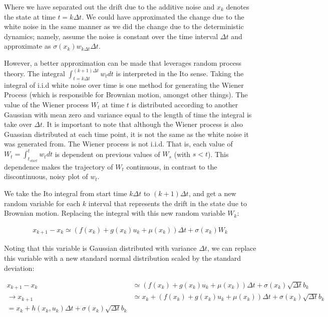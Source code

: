 \documentclass[a4paper]{article}
\begin{document}
Where we have separated out the drift due to the additive noise and $x_k$ denotes the state at time $t = k \Delta t$.
We could have approximated the change due to the white noise in the same manner as we did the change due to the deterministic dynamics;
namely, assume the noise is constant over the time interval $\Delta t$ and approximate as $\sigma(x_k) w_{k \Delta t} \Delta t$.

However, a better approximation can be made that leverages random process theory.
The integral $\int_{t = k \Delta t}^{(k+1) \Delta t} w_t dt$ is interpreted in the Ito sense.
Taking the integral of i.i.d white noise over time is one method for generating the Wiener Process (which is responsible for Brownian motion, amongst other things).
The value of the Wiener process $W_t$ at time $t$ is distributed according to another Gaussian with mean zero and variance equal to the length of time the integral is take over $\Delta t$.
It is important to note that although the Wiener process is also Guassian distributed at each time point, it is not the same as the white noise it was generated from.
The Wiener process is not i.i.d.
That is, each value of $W_t = \int_{t_{start}}^{t} w_t dt$ is dependent on previous values of $W_s$ (with $s<t$).
This dependence makes the trajectory of $W_t$ continuous, in contrast to the discontinuous, noisy plot of $w_t$.

We take the Ito integral from start time $k \Delta t$ to $(k+1) \Delta t$, and get a new random variable for each $k$ interval that represents the drift in the state due to Brownian motion.
Replacing the integral with this new random variable $W_k$:

\begin{align}
x_{k+1} - x_k \simeq (f(x_k) + g(x_k) u_k + \mu(x_k)) \Delta t + \sigma(x_k) W_k
\end{align}

Noting that this variable is Gaussian distributed with variance $\Delta t$, we can replace this variable with a new standard normal distribution scaled by the standard deviation:

\begin{align}
x_{k+1} - x_k &\simeq (f(x_k) + g(x_k) u_k + \mu(x_k)) \Delta t + \sigma(x_k) \sqrt{\Delta t} b_k
\\ \rightarrow x_{k+1} &\simeq x_k + (f(x_k) + g(x_k) u_k + \mu(x_k)) \Delta t + \sigma(x_k) \sqrt{\Delta t} b_k
\label{eq:DistochDyn}
\\= x_k + h(x_k,u_k) \Delta t + \sigma(x_k) \sqrt{\Delta t} b_k
\end{align}
\end{document}
